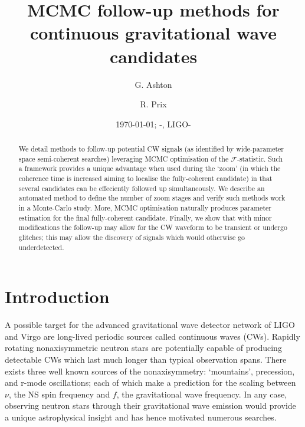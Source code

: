 \documentclass[aps, prd, twocolumn, superscriptaddress, floatfix, showpacs, nofootinbib, longbibliography]{revtex4-1}
\newcommand{\dcc}{LIGO-{\color{red}}}
\begin{document}
\title{MCMC follow-up methods for continuous gravitational wave candidates}

    \author{G. Ashton}
    \author{R. Prix}

\date{\today}

\begin{abstract}

We detail methods to follow-up potential CW signals (as identified by
wide-parameter space semi-coherent searches) leveraging MCMC optimisation of
the $\mathcal{F}$-statistic. Such a framework provides a unique advantage when
used during the `zoom' (in which the coherence time is increased aiming to
localise the fully-coherent candidate) in that several candidates can be
effeciently followed up simultaneously. We describe an automated method to
define the number of zoom stages and verify such methods work in a Monte-Carlo
study. More, MCMC optimisation naturally produces parameter estimation for the
final fully-coherent candidate. Finally, we show that with minor modifications
the follow-up may allow for the CW waveform to be transient or undergo
glitches; this may allow the discovery of signals which would otherwise go
underdetected.

\end{abstract}


\date{\commitDATE; \commitIDshort-\commitSTATUS, \dcc}

\maketitle


\section{Introduction}

A possible target for the advanced gravitational wave detector network of LIGO
and Virgo are long-lived periodic sources called continuous waves (CWs).
Rapidly rotating nonaxisymmetric neutron stars are potentially capable of
producing detectable CWs which last much longer than typical observation spans.
There exists three well known sources of the nonaxisymmetry: `mountains',
precession, and r-mode oscillations; each of which make a prediction for the
scaling between $\nu$, the NS spin frequency and $f$, the gravitational wave
frequency. In any case, observing neutron stars through their gravitational
wave emission would provide a unique astrophysical insight and has hence
motivated numerous searches.
\end{document}
